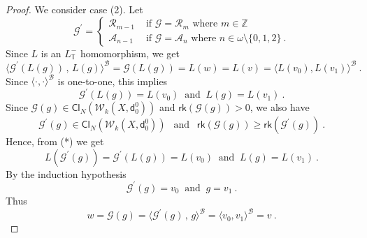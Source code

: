 \documentclass[10pt,a4paper, openany,  oldfontcommands]{memoir}
\newtheorem{open problem} [theorem] {Open Problem}
\newtheorem{open question} [theorem] {Open Question}
\begin{document}
\begin{proof}
 We consider case (2). 
 Let  
 \[
  \mathcal{G}^{  \prime  }    =   \begin{cases}
  \mathcal{R}_{ m-1}     &   \mbox{  if  }      \mathcal{G} =  \mathcal{R}_m    \mbox{  where  }   m  \in  \mathbb{Z}
  \\
    \mathcal{A}_{ n-1}     &   \mbox{  if  }      \mathcal{G} =  \mathcal{A}_n    \mbox{  where  }   n  \in  \omega  \setminus  \lbrace 0, 1,  2  \rbrace
\         .
  \end{cases}
 \]
 Since  $  L $  is an $  L_{  \mathbb{T} }^-  $  homomorphism,  we get  
\[
\langle    \mathcal{G}^{  \prime  }      \left(  L(g)  \right)    \,    ,    \,   L(g)   \rangle^{  \mathcal{B}  }  
= 
 \mathcal{G} \left(  L(g)  \right) 
 =   L(w)   =  L(v)   =  
  \langle  L(v_0) ,  L( v_1)  \rangle^{  \mathcal{B}  }  
\     .
\]
Since  $  \langle  \cdot  ,  \cdot   \rangle^{  \mathcal{B}  }   $  is one-to-one,  
this implies
\[
 \mathcal{G}^{  \prime  }      \left(  L(g)  \right)    =      L(v_0)   
 \     \mbox{  and   }       \    
    L(g)          =    L( v_1 )  
    \         .       \tag{*}
\]
Since    $  \mathcal{G}      \left(  g  \right)     \in     \mathsf{Cl}_{N}  \left(  \mathcal{W}_{k}  \left( X  ,  \mathsf{d}^0_0  \right)   \right)   $  
and $  \mathsf{rk}  \left(    \mathcal{G}      \left(  g   \right)   \right)   >  0  $, 
we also have  
 \[
   \mathcal{G}^{  \prime }      \left(   g \right)     \in     \mathsf{Cl}_{N}  \left(  \mathcal{W}_{k}  \left( X   ,  \mathsf{d}^0_0 \right)   \right)   
   \    \     \mbox{  and  }      \        \   
   \mathsf{rk}  \left(    \mathcal{G}      \left(  g \right)   \right)     \geq   
\mathsf{rk}  \left(    \mathcal{G}^{  \prime }       \left(  g  \right)   \right)   
\        .
\]
Hence,  from (*)   we get  
\[
  L   \left(    \mathcal{G}^{  \prime  }      \left(  g   \right)   \right)  
  =     \mathcal{G}^{  \prime  }      \left(  L(g)  \right)    =      L(v_0)   
 \     \mbox{  and   }       \    
    L(g)          =    L( v_1 )  
    \         .       
\]
By the induction hypothesis 
\[
  \mathcal{G}^{  \prime  }      \left(  g   \right)    =  v_0 
 \     \mbox{  and   }       \    
   g        =   v_1 
    \         .       
\]
Thus 
\[
w  =     \mathcal{G}     \left(  g   \right)  
= 
\langle    \mathcal{G}^{  \prime  }      \left( g   \right)    \,    ,    \,  g   \rangle^{  \mathcal{B}  }  
= 
\langle   v_0,  v_1   \rangle^{  \mathcal{B}  }  
=  v  
\          .
\]
 
 
 
 
 

\end{proof}
\end{document}
